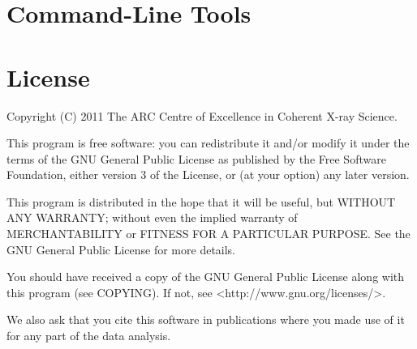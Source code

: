 \documentclass[]{cxs-software}
\begin{document}


\section{Command-Line Tools}

\label{sec:command_tools}


\section{License}

Copyright (C) 2011 The ARC Centre of Excellence in Coherent X-ray
Science.

This program is free software: you can redistribute it and/or modify
it under the terms of the GNU General Public License as published
by the Free Software Foundation, either version 3 of the License,
or (at your option) any later version.

This program is distributed in the hope that it will be useful,
but WITHOUT ANY WARRANTY; without even the implied warranty of
MERCHANTABILITY or FITNESS FOR A PARTICULAR PURPOSE.  See the
GNU General Public License for more details.

You should have received a copy of the GNU General Public License
along with this program (see COPYING).  If not, see
<http://www.gnu.org/licenses/>.

We also ask that you cite this software in publications where you made
use of it for any part of the data analysis.
\end{document}
